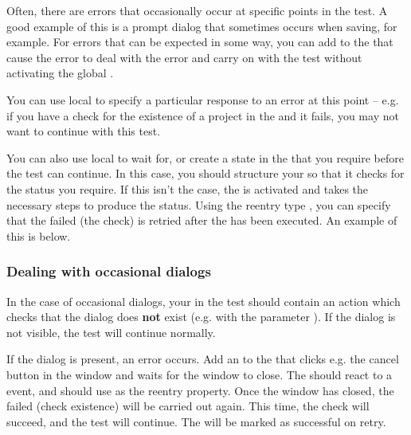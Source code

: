 Often, there are errors that occasionally occur at specific points in the test. A good example of this is a prompt dialog that sometimes occurs when saving, for example. For errors that can be expected in some way, you can add \gdehandlers{} to the \gdcases{} that cause the error to deal with the error and carry on with the test without activating the global \gdehandlers{}.


You can use local \gdehandlers{} to specify a particular response to an error at this point -- e.g. if you have a check for the existence of a project in the \gddb{} and it fails, you may not want to continue with this test. 

You can also use local \gdehandlers{} to wait for, or create a state in the \gdaut{} that you require before the test can continue. In this case, you should structure your \gdcase{} so that it checks for the status you require. If this isn't the case, the \gdehandler{} is activated and takes the necessary steps to produce the status. Using the  reentry type , you can specify that the failed \gdstep{} (the check) is retried after the \gdehandler{} has been executed. An example of this is below. 

\subsubsection{Dealing with occasional dialogs}
In the case of occasional dialogs, your \gdcase{} in the test should contain an action which checks that the dialog does \textbf{not} exist  (e.g. with the parameter ). If the dialog is not visible, the test will continue normally. 

If the dialog is present, an error occurs. Add an \gdehandler{} to the  \gdcase{} that clicks e.g. the cancel button in the window and waits for the window to close. The \gdehandler{} should react to a  event, and should use  as the reentry property. Once the window has closed, the failed \gdstep{} (check existence) will be carried out again. This time, the check will succeed, and the test will continue. The \gdstep{} will be marked as successful on retry. 


